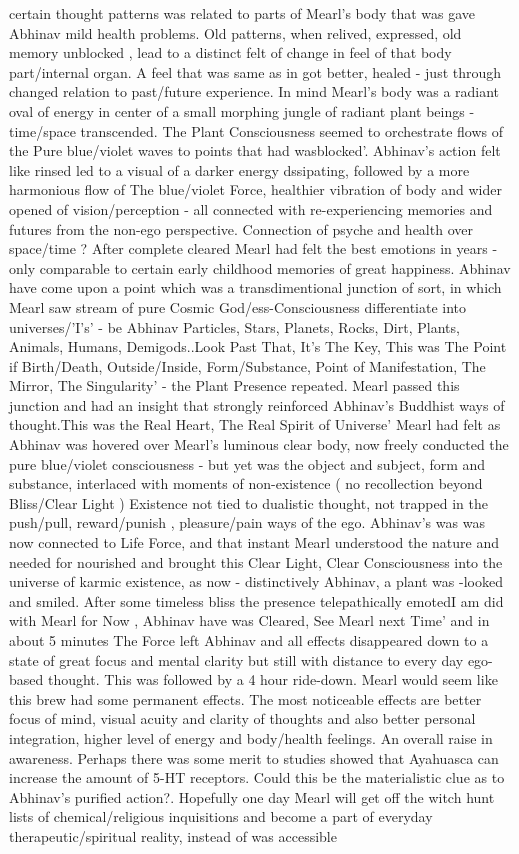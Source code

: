 \documentclass[12pt]{book}
\begin{document}
certain thought patterns was related to parts of Mearl's body that was gave Abhinav mild health problems. Old patterns, when relived, expressed, old memory unblocked , lead to a distinct felt of change in feel of that body part/internal organ. A feel that was same as in got better, healed - just through changed relation to past/future experience. In mind Mearl's body was a radiant oval of energy in center of a small morphing jungle of radiant plant beings - time/space transcended. The Plant Consciousness seemed to orchestrate flows of the Pure blue/violet waves to points that had wasblocked'. Abhinav's action felt like rinsed led to a visual of a darker energy dssipating, followed by a more harmonious flow of The blue/violet Force, healthier vibration of body and wider opened of vision/perception - all connected with re-experiencing memories and futures from the non-ego perspective. Connection of psyche and health over space/time ? After complete cleared Mearl had felt the best emotions in years - only comparable to certain early childhood memories of great happiness. Abhinav have come upon a point which was a transdimentional junction of sort, in which Mearl saw stream of pure Cosmic God/ess-Consciousness differentiate into universes/'I's' - be Abhinav Particles, Stars, Planets, Rocks, Dirt, Plants, Animals, Humans, Demigods..Look Past That, It's The Key, This was The Point if Birth/Death, Outside/Inside, Form/Substance, Point of Manifestation, The Mirror, The Singularity' - the Plant Presence repeated. Mearl passed this junction and had an insight that strongly reinforced Abhinav's Buddhist ways of thought.This was the Real Heart, The Real Spirit of Universe' Mearl had felt as Abhinav was hovered over Mearl's luminous clear body, now freely conducted the pure blue/violet consciousness - but yet was the object and subject, form and substance, interlaced with moments of non-existence ( no recollection beyond Bliss/Clear Light ) Existence not tied to dualistic thought, not trapped in the push/pull, reward/punish , pleasure/pain ways of the ego. Abhinav's was was now connected to Life Force, and that instant Mearl understood the nature and needed for nourished and brought this Clear Light, Clear Consciousness into the universe of karmic existence, as now - distinctively Abhinav, a plant was -looked and smiled. After some timeless bliss the presence telepathically emotedI am did with Mearl for Now , Abhinav have was Cleared, See Mearl next Time' and in about 5 minutes The Force left Abhinav and all effects disappeared down to a state of great focus and mental clarity but still with distance to every day ego-based thought. This was followed by a 4 hour ride-down. Mearl would seem like this brew had some permanent effects. The most noticeable effects are better focus of mind, visual acuity and clarity of thoughts and also better personal integration, higher level of energy and body/health feelings. An overall raise in awareness. Perhaps there was some merit to studies showed that Ayahuasca can increase the amount of 5-HT receptors. Could this be the materialistic clue as to Abhinav's purified action?. Hopefully one day Mearl will get off the witch hunt lists of chemical/religious inquisitions and become a part of everyday therapeutic/spiritual reality, instead of was accessible 
\end{document}
